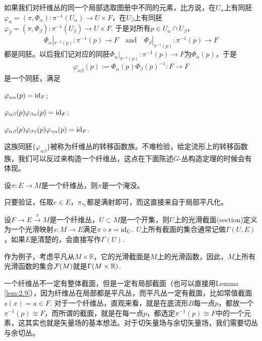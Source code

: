 \begin{para}[转移函数]
如果我们对纤维丛的同一个局部选取图册中不同的元素，比方说，在$U_\alpha$上有同胚$\varphi_\alpha=(\pi,\Phi_\alpha):\pi^{-1}(U_\alpha)\to U\times F$，在$U_\beta$上有同胚$\varphi_\beta=(\pi,\Phi_\beta):\pi^{-1}(U_\beta)\to U\times F$. 于是对所有$p\in U_\alpha\cap U_\beta$，
\[
	\Phi_{\alpha}|_{\pi^{-1}(p)}:\pi^{-1}(p)\to F\quad \text{and}\quad \Phi_{\beta}|_{\pi^{-1}(p)}:\pi^{-1}(p)\to F
\]
都是同胚。以后我们记对应的同胚$\Phi_{\alpha}|_{\pi^{-1}(p)}:\pi^{-1}(p)\to F$为$\Phi_\alpha(p)$，于是
\[
	\varphi_{\alpha\beta}(p):=\Phi_{\alpha}(p)\Phi_{\beta}(p)^{-1}:F\to F
\]
是一个同胚，满足
\begin{compactenum}
	\item $\varphi_{\alpha\alpha}(p)=\operatorname{id}_F$;
	\item $\varphi_{\alpha\beta}(p)\varphi_{\beta\alpha}(p)=\operatorname{id}_F$;
	\item $\varphi_{\alpha\beta}(p)\varphi_{\beta\gamma}(p)\varphi_{\gamma\alpha}(p)=\operatorname{id}_F$.
\end{compactenum}
这族同胚$\{\varphi_{\alpha\beta}\}$被称为纤维丛的转移函数族。不难检验，给定流形上的转移函数族，我们可以反过来构造一个纤维丛，这点在下面陈述$G$-丛构造定理的时候会有体现。
\end{para}

\begin{lem}
设$\pi:E\to M$是一个纤维丛，则$\pi$是一个淹没。
\end{lem}

只要验证，任取$e\in E$，$\pi_{*e}$都是满射即可，而这直接来自于局部平凡化。

\begin{para}[截面]
设$F\to E\xrightarrow{\pi} M$是一个纤维丛，$U\subset M$是一个开集，则$U$上的光滑截面(section)定义为一个光滑映射$s:M\to E$满足$\pi\circ s=\operatorname{id}_U$. $U$上所有截面的集合通常记做$\Gamma(U,E)$，如果$E$是清楚的，会直接写作$\Gamma(U)$. 
\end{para}

作为例子，考虑平凡从$M\times \mathbb{R}$，它的光滑截面是$M$上的光滑函数，因此，$M$上所有光滑函数的集合$\mathcal{F}(M)$就是$\Gamma(M\times \mathbb{R})$.

一个纤维丛不一定有整体截面，但是一定有局部截面（也可以直接用Lemma \ref{lem:2.9}），因为纤维丛在局部都是平凡丛，而平凡丛一定有截面，比如常值截面$s(x)=a\in F$. 对于一个纤维丛，直观来看，就是在底流形$B$每一点$p$，都放一个$\pi^{-1}(p)\cong F$，而所谓的截面，就是在每一点$p$，都选定$\pi^{-1}(p)\cong F$中的一个元素，这其实也就是矢量场的基本想法。对于切矢量场与余切矢量场，我们需要切丛与余切丛。


